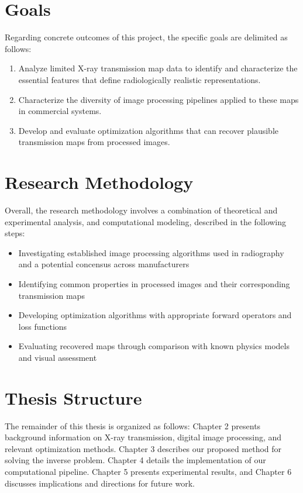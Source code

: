 \documentclass[nomenclature, english, bibtex]{kththesis}
\numberwithin{listing}{chapter}
\begin{document}
\section{Goals}

Regarding concrete outcomes of this project, the specific goals are delimited as follows:

\begin{enumerate}
    \item Analyze limited X-ray transmission map data to identify and characterize the essential features that define radiologically realistic representations.
    \item Characterize the diversity of image processing pipelines applied to these maps in commercial systems.
    \item Develop and evaluate optimization algorithms that can recover plausible transmission maps from processed images.
\end{enumerate}

\section{Research Methodology}

Overall, the research methodology involves a combination of theoretical and experimental analysis, and computational modeling, described in the following steps:

\begin{itemize}
    \item Investigating established image processing algorithms used in radiography and a potential concensus across manufacturers
    \item Identifying common properties in processed images and their corresponding transmission maps
    \item Developing optimization algorithms with appropriate forward operators and loss functions
    \item Evaluating recovered maps through comparison with known physics models and visual assessment
\end{itemize}

\section{Thesis Structure}
The remainder of this thesis is organized as follows: Chapter 2 presents background information on X-ray transmission, digital image processing, and relevant optimization methods. Chapter 3 describes our proposed method for solving the inverse problem. Chapter 4 details the implementation of our computational pipeline. Chapter 5 presents experimental results, and Chapter 6 discusses implications and directions for future work.
\end{document}
